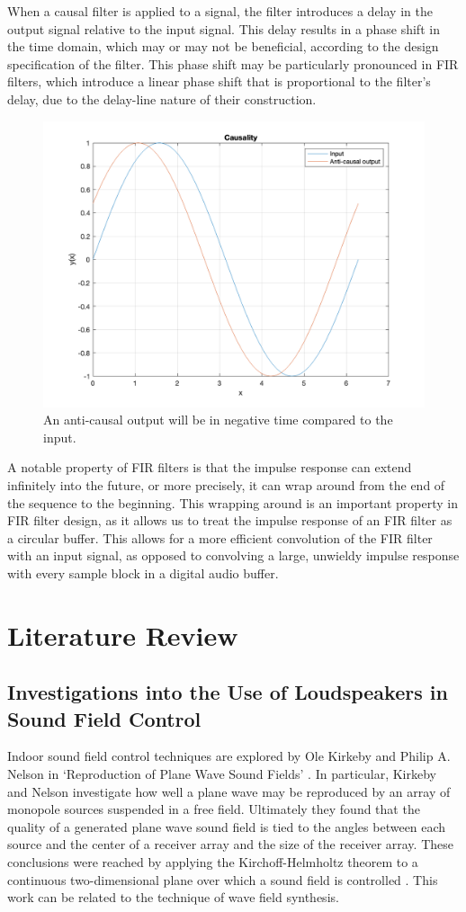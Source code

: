 \documentclass{report}
\begin{document}
        When a causal filter is applied to a signal, the filter introduces a delay in the output signal relative to the input signal.
        This delay results in a phase shift in the time domain, which may or may not be beneficial, according to the design specification of the filter.
        This phase shift may be particularly pronounced in FIR filters, which introduce a linear phase shift that is proportional to the filter's delay, due to the delay-line nature of their construction.

        \begin{figure}[H]
            \centering
            \includegraphics[width = 0.5\linewidth]{figs/causality.png}
            \caption{An anti-causal output will be in negative time compared to the input.}
            \label{causality}
        \end{figure}
        
        A notable property of FIR filters is that the impulse response can extend infinitely into the future, or more precisely, it can wrap around from the end of the sequence to the beginning.
        This wrapping around is an important property in FIR filter design, as it allows us to treat the impulse response of an FIR filter as a circular buffer.
        This allows for a more efficient convolution of the FIR filter with an input signal, as opposed to convolving a large, unwieldy impulse response with every sample block in a digital audio buffer.

        
\chapter{Literature Review}
    \section{Investigations into the Use of Loudspeakers in Sound Field Control}

        Indoor sound field control techniques are explored by Ole Kirkeby and Philip A. Nelson in `Reproduction of Plane Wave Sound Fields' \cite{kirkeby1993reproduction}.
        In particular, Kirkeby and Nelson investigate how well a plane wave may be reproduced by an array of monopole sources suspended in a free field.
        Ultimately they found that the quality of a generated plane wave sound field is tied to the angles between each source and the center of a receiver array and the size of the receiver array.
        These conclusions were reached by applying the Kirchoff-Helmholtz theorem to a continuous two-dimensional plane over which a sound field is controlled \cite{kirkeby1993reproduction}.
        This work can be related to the technique of wave field synthesis.
\end{document}
